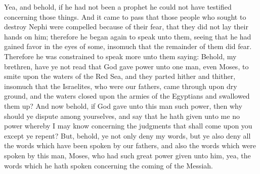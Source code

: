 \bverse \iffalse Yea, and behold, if he had not been a prophet he could not have testified concerning those things. \fi
Yea, and behold, if he had not been a prophet he could not have testified concerning those things.
\bverse \iffalse And it came to pass that those people who sought to destroy Nephi were compelled because of their fear, that they did not lay their hands on him; therefore he began again to speak unto them, seeing that he had gained favor in the eyes of some, insomuch that the remainder of them did fear. \fi
And it came to pass that those people who sought to destroy Nephi were compelled because of their fear, that they did not lay their hands on him; therefore he began again to speak unto them, seeing that he had gained favor in the eyes of some, insomuch that the remainder of them did fear.
\bverse \iffalse Therefore he was constrained to speak more unto them saying: Behold, my brethren, have ye not read that God gave power unto one man, even Moses, to smite upon the waters of the Red Sea, and they parted hither and thither, insomuch that the Israelites, who were our fathers, came through upon dry ground, and the waters closed upon the armies of the Egyptians and swallowed them up? \fi
Therefore he was constrained to speak more unto them saying: Behold, my brethren, have ye not read that God gave power unto one man, even Moses, to smite upon the waters of the Red Sea, and they parted hither and thither, insomuch that the Israelites, who were our fathers, came through upon dry ground, and the waters closed upon the armies of the Egyptians and swallowed them up?
\bverse \iffalse And now behold, if God gave unto this man such power, then why should ye dispute among yourselves, and say that he hath given unto me no power whereby I may know concerning the judgments that shall come upon you except ye repent? \fi
And now behold, if God gave unto this man such power, then why should ye dispute among yourselves, and say that he hath given unto me no power whereby I may know concerning the judgments that shall come upon you except ye repent?
\bverse \iffalse But, behold, ye not only deny my words, but ye also deny all the words which have been spoken by our fathers, and also the words which were spoken by this man, Moses, who had such great power given unto him, yea, the words which he hath spoken concerning the coming of the Messiah. \fi
But, behold, ye not only deny my words, but ye also deny all the words which have been spoken by our fathers, and also the words which were spoken by this man, Moses, who had such great power given unto him, yea, the words which he hath spoken concerning the coming of the Messiah.
